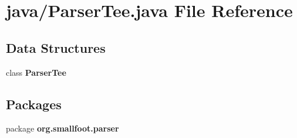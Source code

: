 \section{java/\-Parser\-Tee.java File Reference}
\label{ParserTee_8java}
\subsection*{Data Structures}
\begin{DoxyCompactItemize}
\item 
class {\bf Parser\-Tee}
\end{DoxyCompactItemize}
\subsection*{Packages}
\begin{DoxyCompactItemize}
\item 
package {\bf org.\-smallfoot.\-parser}
\end{DoxyCompactItemize}
